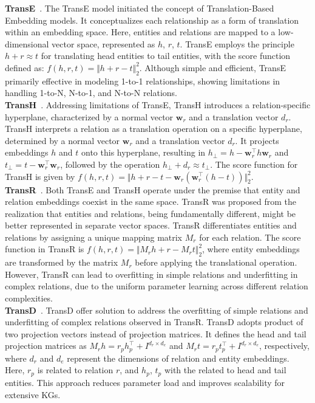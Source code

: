 \documentclass{article}
\begin{document}
\textbf{TransE}~\cite{bordes2013translating}. The TransE model initiated the concept of Translation-Based Embedding models. It conceptualizes each relationship as a form of translation within an embedding space. Here, entities and relations are mapped to a low-dimensional vector space, represented as $h$, $r$, $t$. TransE employs the principle $h + r \approx t$ for translating head entities to tail entities, with the score function defined as: $f(h, r, t) = \Vert h + r - t\Vert_2^2$. Although simple and efficient, TransE primarily effective in modeling 1-to-1 relationships, showing limitations in handling 1-to-N, N-to-1, and N-to-N relations.\\
\textbf{TransH}~\cite{wang2014knowledge}. Addressing limitations of TransE, TransH introduces a relation-specific hyperplane, characterized by a normal vector $\textbf{w}_r$ and a translation vector $d_r$. TransH interprets a relation as a translation operation on a specific hyperplane, determined by a normal vector $\textbf{w}_r$ and a translation vector $d_r$. It projects embeddings $h$ and $t$ onto this hyperplane, resulting in $h_\perp = h - \textbf{w}_r^{\top}h\textbf{w}_r$ and $t_{\perp} = t - \textbf{w}_r^{\top}\textbf{w}_r$, followed by the operation $h_\perp + d_r \approx t_\perp$. The score function for TransH is given by $f(h, r, t) = \Vert h + r - t - \textbf{w}_r(\textbf{w}_r^\top(h - t))\Vert_2^2$.\\
\textbf{TransR}~\cite{lin2015learning}. Both TransE and TransH operate under the premise that entity and relation embeddings coexist in the same space. TransR was proposed from the realization that entities and relations, being fundamentally different, might be better represented in separate vector spaces. TransR differentiates entities and relations by assigning a unique mapping matrix $M_r$ for each relation. The score function in TransR is $f(h, r, t) = \Vert M_r h + r - M_r t\Vert_2^2$, where entity embeddings are transformed by the matrix $M_r$ before applying the translational operation. However, TransR can lead to overfitting in simple relations and underfitting in complex relations, due to the uniform parameter learning across different relation complexities.\\
\textbf{TransD}~\cite{ji2015knowledge}. TransD offer solution to address the overfitting of simple relations and underfitting of complex relations observed in TransR. TransD adopts product of two projection vectors instead of projection matrices. It defines the head and tail projection matrices as $M_rh = r_ph_p^\top + I^{d_r \times d_e}$ and $M_rt = r_pt_p^\top + I^{d_r \times d_e}$, respectively, where $d_r$ and $d_e$ represent the dimensions of relation and entity embeddings. Here, $r_p$ is related to relation $r$, and $h_p$, $t_p$ with the related to head and tail entities. This approach reduces parameter load and improves scalability for extensive KGs.\\
\end{document}
